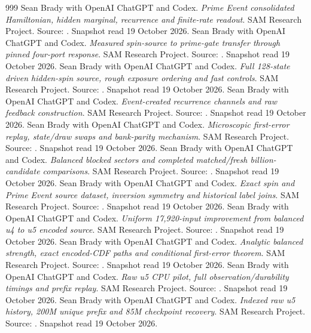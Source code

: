 \begin{thebibliography}{999}
 Sean Brady with OpenAI ChatGPT and Codex. \emph{Prime Event consolidated Hamiltonian, hidden marginal, recurrence and finite-rate readout}. SAM Research Project. Source: . Snapshot read 19 October 2026.
 Sean Brady with OpenAI ChatGPT and Codex. \emph{Measured spin-source to prime-gate transfer through pinned four-port response}. SAM Research Project. Source: . Snapshot read 19 October 2026.
 Sean Brady with OpenAI ChatGPT and Codex. \emph{Full 128-state driven hidden-spin source, rough exposure ordering and fast controls}. SAM Research Project. Source: . Snapshot read 19 October 2026.
 Sean Brady with OpenAI ChatGPT and Codex. \emph{Event-created recurrence channels and raw feedback construction}. SAM Research Project. Source: . Snapshot read 19 October 2026.
 Sean Brady with OpenAI ChatGPT and Codex. \emph{Microscopic first-error replay, state/draw swaps and bank-parity mechanism}. SAM Research Project. Source: . Snapshot read 19 October 2026.
 Sean Brady with OpenAI ChatGPT and Codex. \emph{Balanced blocked sectors and completed matched/fresh billion-candidate comparisons}. SAM Research Project. Source: . Snapshot read 19 October 2026.
 Sean Brady with OpenAI ChatGPT and Codex. \emph{Exact spin and Prime Event source dataset, inversion symmetry and historical label joins}. SAM Research Project. Source: . Snapshot read 19 October 2026.
 Sean Brady with OpenAI ChatGPT and Codex. \emph{Uniform 17,920-input improvement from balanced u4 to u5 encoded source}. SAM Research Project. Source: . Snapshot read 19 October 2026.
 Sean Brady with OpenAI ChatGPT and Codex. \emph{Analytic balanced strength, exact encoded-CDF paths and conditional first-error theorem}. SAM Research Project. Source: . Snapshot read 19 October 2026.
 Sean Brady with OpenAI ChatGPT and Codex. \emph{Raw u5 CPU pilot, full observation/durability timings and prefix replay}. SAM Research Project. Source: . Snapshot read 19 October 2026.
 Sean Brady with OpenAI ChatGPT and Codex. \emph{Indexed raw u5 history, 200M unique prefix and 85M checkpoint recovery}. SAM Research Project. Source: . Snapshot read 19 October 2026.

\end{thebibliography}
